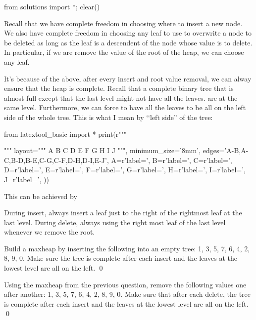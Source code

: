 \begin{python0}
from solutions import *; clear()
\end{python0}

Recall that we have complete freedom in choosing where to insert a new node.
We also have complete freedom in choosing any leaf to use to overwrite
a node to be deleted as long as the leaf is a descendent of the node whose
value is to delete.
In particular, if we are remove the value of the root of the heap,
we can choose any leaf.

It's because of the above,
after every insert and root value removal,
we can alway ensure that the heap is complete.
Recall that a complete binary tree that is almost full except that the
last level might not have all the leaves.
are at the same level.
Furthermore, we can force to have
all the leaves to be all on the left side of the whole
tree.
This is what I mean by \lq\lq left side'' of the tree:

\begin{python}
from latextool_basic import *
print(r"""
\begin{center}
\end{center}
""" %
layout="""
      A 
   B     C
 D   E F   G
H I J
""",
minimum_size='8mm',
edges='A-B,A-C,B-D,B-E,C-G,C-F,D-H,D-I,E-J',
A=r'label=',
B=r'label=',
C=r'label=',
D=r'label=',
E=r'label=',
F=r'label=',
G=r'label=',
H=r'label=',
I=r'label=',
J=r'label=',
))
\end{python}

This can be achieved by
\begin{tightlist}
\li During insert, always insert a leaf just to the right of the
rightmost leaf at the last level.
\li During delete, always using the right most leaf of the 
last level whenever we remove the root.
\end{tightlist}




\newpage
\begin{ex}
Build a maxheap by inserting the following into an empty tree:
1, 3, 5, 7, 6, 4, 2, 8, 9, 0.
Make sure the tree is complete after each insert and the leaves
at the lowest level are all on the left.
\qed
\end{ex}

\newpage
\begin{ex}
Using the maxheap from the previous question,
remove the following values one after another:
1, 3, 5, 7, 6, 4, 2, 8, 9, 0.
Make sure that after each delete, the tree is complete after each insert and the leaves
at the lowest level are all on the left.
\qed
\end{ex}

